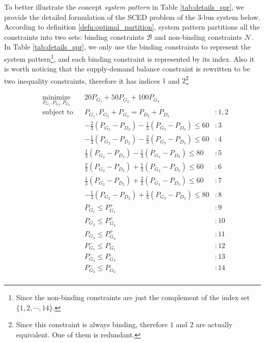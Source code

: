 \documentclass[letterpaper, 11pt]{article}
\theoremstyle{plain}
\theoremstyle{definition}
\begin{document}
To better illustrate the concept \emph{system pattern} in Table \ref{tab:details_spr}, we provide the detailed formulation of the SCED problem of the 3-bus system below. According to definition \ref{defn:optimal_partition}, system pattern partitions all the constraints into two sets: binding constraints $\mathcal{B}$ and non-binding constraints $\mathcal{N}$. In Table \ref{tab:details_spr}, we only use the binding constraints to represent the system pattern\footnote{Since the non-binding constraints are just the complement of the index set $\{1,2,\cdots,14\}$.}, and each binding constraint is represented by its index. Also it is worth noticing that the supply-demand balance constraint is rewritten to be two inequality constraints, therefore it has indices $1$ and $2$\footnote{Since this constraint is always binding, therefore $1$ and $2$ are actually equivalent. One of them is redundant.}

\begin{equation*}
\begin{aligned}
& \underset{P_{G_1},P_{G_2},P_{G_3}}{\text{minimize}} & & 20P_{G_1}+50P_{G_2}+100P_{G_3} &\\
& \text{subject to} & & P_{G_1}, P_{G_2}+P_{G_3} = P_{D_2}+P_{D_2} & :1,2\\
& & & -\frac{2}{3}(P_{G_2}-P_{D_2}) -\frac{1}{3}(P_{G_3}-P_{D_3}) \le 60 &:3 \\
& & & -\frac{1}{3}(P_{G_2}-P_{D_2}) -\frac{2}{3}(P_{G_3}-P_{D_3}) \le 60 &:4 \\
& & & \frac{1}{3}(P_{G_2}-P_{D_2}) -\frac{1}{3}(P_{G_3}-P_{D_3}) \le 80 &:5 \\
& & & \frac{2}{3}(P_{G_2}-P_{D_2}) +\frac{1}{3}(P_{G_3}-P_{D_3}) \le 60 &:6 \\
& & & \frac{1}{3}(P_{G_2}-P_{D_2}) +\frac{2}{3}(P_{G_3}-P_{D_3}) \le 60 &:7 \\
& & & -\frac{1}{3}(P_{G_2}-P_{D_2}) +\frac{1}{3}(P_{G_3}-P_{D_3}) \le 80 &:8 \\
& & & P_{G_1} \le P_{G_1}^+ & :9\\
& & & P_{G_2} \le P_{G_2}^+ & :10\\
& & & P_{G_3} \le P_{G_3}^+ & :11\\
& & & P_{G_1}^- \le P_{G_1} & :12\\
& & & P_{G_2}^- \le P_{G_2} & :13\\
& & & P_{G_3}^- \le P_{G_3} & :14\\
\end{aligned}
\end{equation*}
\end{document}
